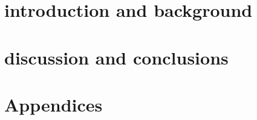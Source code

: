 \documentclass[\classfontsize,\papersize,twoside,showtrims,extrafontsizes]{memoir}  %
\begin{document}
\prefrontmatter

\cleartoevenpage

\cleartooddpage

\cleartoevenpage

\frontmatter





% 

\clearforchapter
\printglossary[title=Abbreviations, toctitle=abbrevations, type=\acronymtype]
\clearforchapter
\tableofcontents*
\clearforchapter
\mylistoftodos

\mainmatter
\part[introduction and background]{introduction and background}


\part[discussion and conclusions]{discussion and conclusions}


% 
% 
% 
% 

\part[Appendices]{Appendices}
\appendix


\backmatter
\printbibliography
\end{document}
